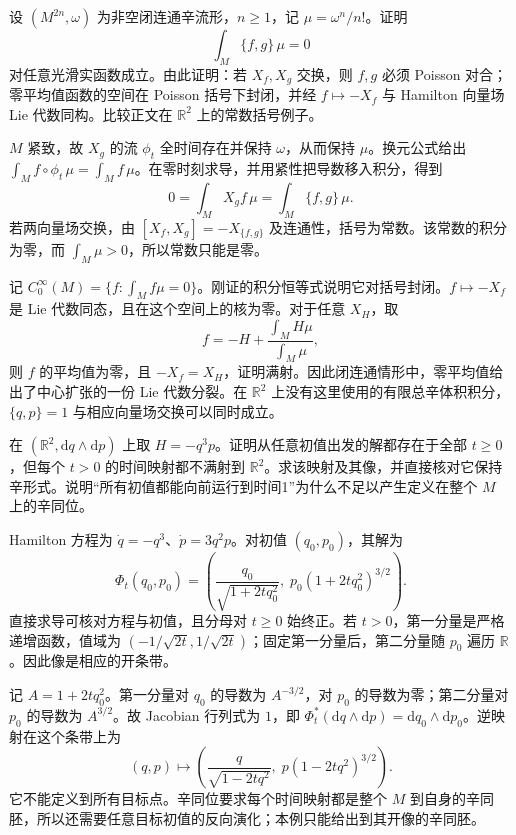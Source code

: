 \begin{exercise}\label{g4:ex:0902:mean-zero-bracket}
	设 \((M^{2n},\omega)\) 为非空闭连通辛流形，\(n\ge1\)，记 \(\mu=\omega^n/n!\)。证明
	\[
		\int_M\{f,g\}\,\mu=0
	\]
	对任意光滑实函数成立。由此证明：若 \(X_f,X_g\) 交换，则 \(f,g\) 必须 Poisson 对合；零平均值函数的空间在 Poisson 括号下封闭，并经 \(f\mapsto-X_f\) 与 Hamilton 向量场 Lie 代数同构。比较正文在 \(\mathbb R^2\) 上的常数括号例子。
\end{exercise}
\begin{solution}
	\(M\) 紧致，故 \(X_g\) 的流 \(\phi_t\) 全时间存在并保持 \(\omega\)，从而保持 \(\mu\)。换元公式给出 \(\int_M f\circ\phi_t\,\mu=\int_M f\,\mu\)。在零时刻求导，并用紧性把导数移入积分，得到
	\[
		0=\int_M X_gf\,\mu=\int_M\{f,g\}\,\mu.
	\]
	若两向量场交换，由 \([X_f,X_g]=-X_{\{f,g\}}\) 及连通性，括号为常数。该常数的积分为零，而 \(\int_M\mu>0\)，所以常数只能是零。

	记 \(C_0^\infty(M)=\{f:\int_M f\mu=0\}\)。刚证的积分恒等式说明它对括号封闭。\(f\mapsto-X_f\) 是 Lie 代数同态，且在这个空间上的核为零。对于任意 \(X_H\)，取
	\[
		f=-H+\frac{\int_M H\mu}{\int_M\mu},
	\]
	则 \(f\) 的平均值为零，且 \(-X_f=X_H\)，证明满射。因此闭连通情形中，零平均值给出了中心扩张的一份 Lie 代数分裂。在 \(\mathbb R^2\) 上没有这里使用的有限总辛体积积分，\(\{q,p\}=1\) 与相应向量场交换可以同时成立。
\end{solution}

\begin{exercise}\label{g4:ex:0901:forward-not-onto}
	在 \((\mathbb R^2,\mathrm{d}q\wedge\mathrm{d}p)\) 上取 \(H=-q^3p\)。证明从任意初值出发的解都存在于全部 \(t\ge0\)，但每个 \(t>0\) 的时间映射都不满射到 \(\mathbb R^2\)。求该映射及其像，并直接核对它保持辛形式。说明“所有初值都能向前运行到时间1”为什么不足以产生定义在整个 \(M\) 上的辛同位。
\end{exercise}
\begin{solution}
	Hamilton 方程为 \(\dot q=-q^3\)、\(\dot p=3q^2p\)。对初值 \((q_0,p_0)\)，其解为
	\[
		\Phi_t(q_0,p_0)=\left(
		\frac{q_0}{\sqrt{1+2tq_0^2}},\;
		p_0(1+2tq_0^2)^{3/2}\right).
	\]
	直接求导可核对方程与初值，且分母对 \(t\ge0\) 始终正。若 \(t>0\)，第一分量是严格递增函数，值域为 \((-1/\sqrt{2t},1/\sqrt{2t})\)；固定第一分量后，第二分量随 \(p_0\) 遍历 \(\mathbb R\)。因此像是相应的开条带。

	记 \(A=1+2tq_0^2\)。第一分量对 \(q_0\) 的导数为 \(A^{-3/2}\)，对 \(p_0\) 的导数为零；第二分量对 \(p_0\) 的导数为 \(A^{3/2}\)。故 Jacobian 行列式为 \(1\)，即 \(\Phi_t^*(\mathrm{d}q\wedge\mathrm{d}p)=\mathrm{d}q_0\wedge\mathrm{d}p_0\)。逆映射在这个条带上为
	\[
		(q,p)\longmapsto
		\left(\frac{q}{\sqrt{1-2tq^2}},\;p(1-2tq^2)^{3/2}\right).
	\]
	它不能定义到所有目标点。辛同位要求每个时间映射都是整个 \(M\) 到自身的辛同胚，所以还需要任意目标初值的反向演化；本例只能给出到其开像的辛同胚。
\end{solution}

